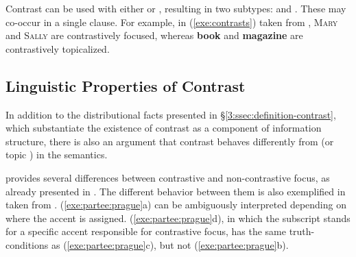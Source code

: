 Contrast can be used with either  or , resulting in two
subtypes:   and .  These may 
co-occur in a single clause. For example, in (\ref{exe:contrasts})
taken from \citet{van:05}, \textsc{Mary} and \textsc{Sally} are
contrastively focused, whereas \textbf{book} and \textbf{magazine} are
contrastively topicalized.




\subsection{Linguistic Properties of Contrast}
\label{3:ssec:properties-contrast}


In addition to the distributional facts presented in
\S\ref{3:ssec:definition-contrast}, which substantiate the existence
of contrast as a component of information structure, there is also an
argument that contrast behaves differently from 
(or topic ) in the semantics.


\cite{gundel:99} provides several differences between contrastive
 and non-contrastive focus, as already presented in
.  The different behavior between them is also
exemplified in  taken from
\citet{partee:91}. (\ref{exe:partee:prague}a) can be ambiguously
interpreted depending on where the accent is
assigned. (\ref{exe:partee:prague}d), in which the subscript
 stands for a specific accent responsible for
contrastive focus, has the same truth-conditions as
(\ref{exe:partee:prague}c), but not
(\ref{exe:partee:prague}b).






